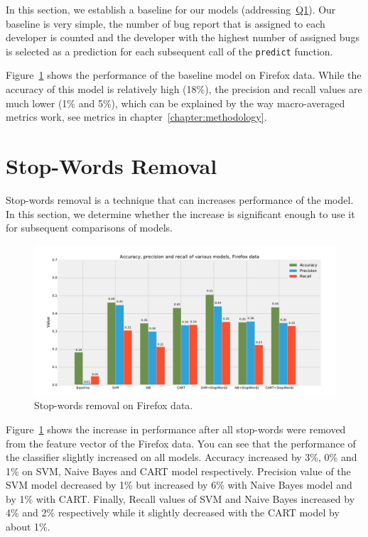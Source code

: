 In this section, we establish a baseline for our models (addressing~\hyperlink{question:1}{Q1}). Our baseline is very simple, the number of bug report that is assigned to each developer is counted and the developer with the highest number of assigned bugs is selected as a prediction for each subsequent call of the \texttt{predict} function.

Figure~\ref{fig:models.firefox.stopwords} shows the performance of the baseline model on Firefox data. While the accuracy of this model is relatively high (18\%), the precision and recall values are much lower (1\% and 5\%), which can be explained by the way macro-averaged metrics work, see metrics in chapter~\ref{chapter:methodology}.

\section{Stop-Words Removal}

Stop-words removal is a technique that can increases performance of the model. In this section, we determine whether the increase is significant enough to use it for subsequent comparisons of models.

\begin{figure}[htbp]
    \centering
        \includegraphics[width=\textwidth]{./images/comparison_of_models/firefox_0.pdf}
    \caption{Stop-words removal on Firefox data.}
    \label{fig:models.firefox.stopwords}
\end{figure}

Figure~\ref{fig:models.firefox.stopwords} shows the increase in performance after all stop-words were removed from the feature vector of the Firefox data. You can see that the performance of the classifier slightly increased on all models. Accuracy increased by 3\%, 0\% and 1\% on SVM, Naive Bayes and CART model respectively. Precision value of the SVM model decreased by 1\% but increased by 6\% with Naive Bayes model and by 1\% with CART. Finally, Recall values of SVM and Naive Bayes increased by 4\% and 2\% respectively while it slightly decreased with the CART model by about 1\%.

